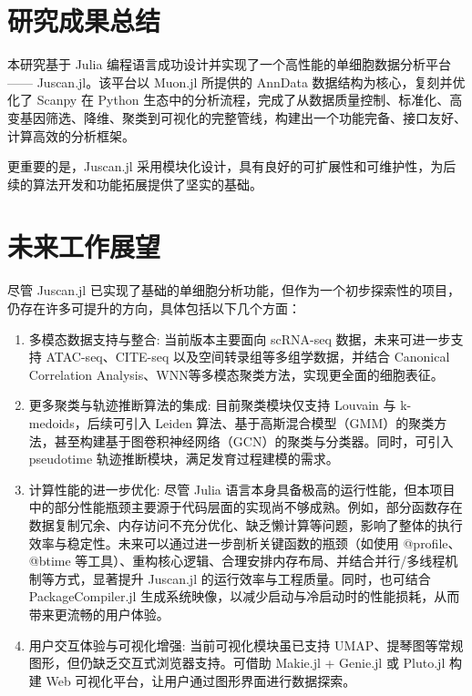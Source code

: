 
\section{研究成果总结}

本研究基于 Julia 编程语言成功设计并实现了一个高性能的单细胞数据分析平台 —— Juscan.jl。该平台以 Muon.jl 所提供的 AnnData 数据结构为核心，复刻并优化了 Scanpy 在 Python 生态中的分析流程，完成了从数据质量控制、标准化、高变基因筛选、降维、聚类到可视化的完整管线，构建出一个功能完备、接口友好、计算高效的分析框架。

更重要的是，Juscan.jl 采用模块化设计，具有良好的可扩展性和可维护性，为后续的算法开发和功能拓展提供了坚实的基础。

\section{未来工作展望}


尽管 Juscan.jl 已实现了基础的单细胞分析功能，但作为一个初步探索性的项目，仍存在许多可提升的方向，具体包括以下几个方面：

\begin{enumerate}
\item 多模态数据支持与整合: 当前版本主要面向 scRNA-seq 数据，未来可进一步支持 ATAC-seq、CITE-seq 以及空间转录组等多组学数据，并结合 Canonical Correlation Analysis、WNN等多模态聚类方法，实现更全面的细胞表征。
\item 更多聚类与轨迹推断算法的集成: 目前聚类模块仅支持 Louvain 与 k-medoids，后续可引入 Leiden 算法、基于高斯混合模型（GMM）的聚类方法，甚至构建基于图卷积神经网络（GCN）的聚类与分类器。同时，可引入 pseudotime 轨迹推断模块，满足发育过程建模的需求。
\item 计算性能的进一步优化: 尽管 Julia 语言本身具备极高的运行性能，但本项目中的部分性能瓶颈主要源于代码层面的实现尚不够成熟。例如，部分函数存在数据复制冗余、内存访问不充分优化、缺乏懒计算等问题，影响了整体的执行效率与稳定性。未来可以通过进一步剖析关键函数的瓶颈（如使用 @profile、@btime 等工具）、重构核心逻辑、合理安排内存布局、并结合并行/多线程机制等方式，显著提升 Juscan.jl 的运行效率与工程质量。同时，也可结合 PackageCompiler.jl 生成系统映像，以减少启动与冷启动时的性能损耗，从而带来更流畅的用户体验。
\item 用户交互体验与可视化增强: 当前可视化模块虽已支持 UMAP、提琴图等常规图形，但仍缺乏交互式浏览器支持。可借助 Makie.jl + Genie.jl 或 Pluto.jl 构建 Web 可视化平台，让用户通过图形界面进行数据探索。
\end{enumerate}
